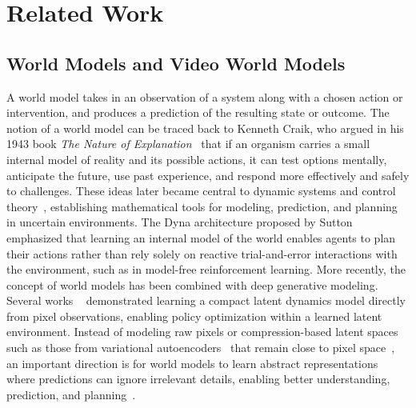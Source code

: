 
\section{Related Work}
\label{sec:related_work}

\subsection{World Models and Video World Models} 
A world model takes in an observation of a system along with a chosen action or intervention, and produces a prediction of the resulting state or outcome. The notion of a world model can be traced back to Kenneth Craik, who argued in his 1943 book \textit{The Nature of Explanation}~\cite{craik1943nature} that if an organism carries a small internal model of reality and its possible actions, it can test options mentally, anticipate the future, use past experience, and respond more effectively and safely to challenges. These ideas later became central to dynamic systems and control theory~\cite{bellman1957dynamic, kalman1960new, bryson1975applied}, establishing mathematical tools for modeling, prediction, and planning in uncertain environments. The Dyna architecture proposed by Sutton~\cite{sutton_dyna1991} emphasized that learning an internal model of the world enables agents to plan their actions rather than rely solely on reactive trial-and-error interactions with the environment, such as in model-free reinforcement learning. More recently, the concept of world models has been combined with deep generative modeling. Several works ~\cite{ha2018world, hafner2020dreamcontrollearningbehaviors, hafner2020mastering, hafner2023mastering, hafner2025trainingagentsinsidescalable} demonstrated learning a compact latent dynamics model directly from pixel observations, enabling policy optimization within a learned latent environment. Instead of modeling raw pixels or compression-based latent spaces such as those from variational autoencoders~\cite{kingma2013auto} that remain close to pixel space~\cite{zheng2025diffusion}, an important direction is for world models to learn abstract representations where predictions can ignore irrelevant details, enabling better understanding, prediction, and planning~\cite{zhou2024dino, bardes2024revisiting, assran2025v}.

